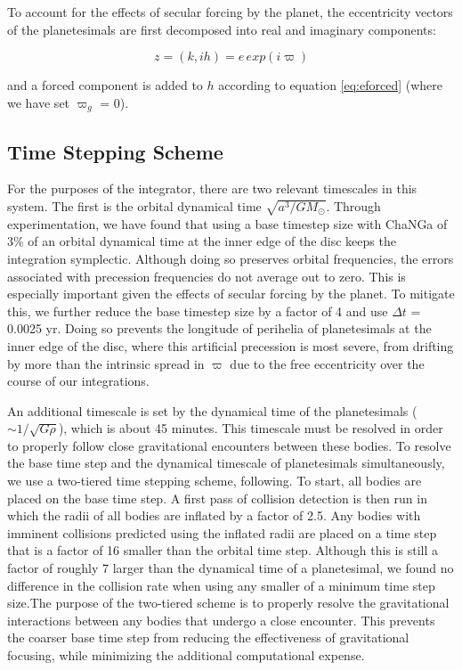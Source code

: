 \documentclass[fleqn,usenatbib]{mnras}
\begin{document}
To account for the effects of secular forcing by the planet, the eccentricity vectors of the planetesimals are first decomposed into real and imaginary 
components:

\begin{equation}\label{eq:kh}
	z = (k, ih) = e \, exp(i \varpi)
\end{equation}

\noindent and a forced component is added to $h$ according to equation \ref{eq:eforced} (where we have set $\varpi_{g}$ = 0).

\subsection{Time Stepping Scheme}\label{sec:timestep}

For the purposes of the integrator, there are two relevant timescales in this system. The first is the orbital dynamical time $\sqrt{a^3/
G M_{\odot}}$. Through experimentation, we have found that using a base timestep size with {\sc ChaNGa} of 3\% of an orbital dynamical time
at the inner edge of the disc keeps the integration symplectic. Although doing so preserves orbital frequencies, the errors associated with
precession frequencies do not average out to zero. This is especially important given the effects of secular forcing by the planet. To mitigate
this, we further reduce the base timestep size by a factor of 4 and use $\Delta t$ = 0.0025 yr. Doing so prevents the longitude of perihelia of
planetesimals at the inner edge of the disc, where this artificial precession is most severe, from drifting by more than the intrinsic spread in $\varpi$ due to the
free eccentricity over the course of our integrations.

An additional timescale is set by the dynamical time of the planetesimals ($\sim 1/\sqrt{G \rho}$), which is about 45 minutes. This timescale must be resolved in order to properly 
follow close gravitational encounters between these bodies. To resolve the base time step and the dynamical timescale of planetesimals simultaneously, we use a two-tiered time 
stepping scheme, following\citep{2015ApJ...806...23L}. To start, all bodies are placed on the base time step. A first pass of collision detection is then run in which the radii of all bodies are 
inflated by a factor of 2.5. Any bodies with imminent collisions predicted using the inflated radii are placed on a time step that is a factor of 16 smaller than the orbital time step. Although 
this is still a factor of roughly 7 larger than the dynamical time of a planetesimal, we found no difference in the collision rate when using any smaller of a minimum time step size.The 
purpose of the two-tiered scheme is to properly resolve the gravitational interactions between any bodies that undergo a close encounter. This prevents the coarser base time step from 
reducing the effectiveness of gravitational focusing, while minimizing the additional computational expense.
\end{document}

